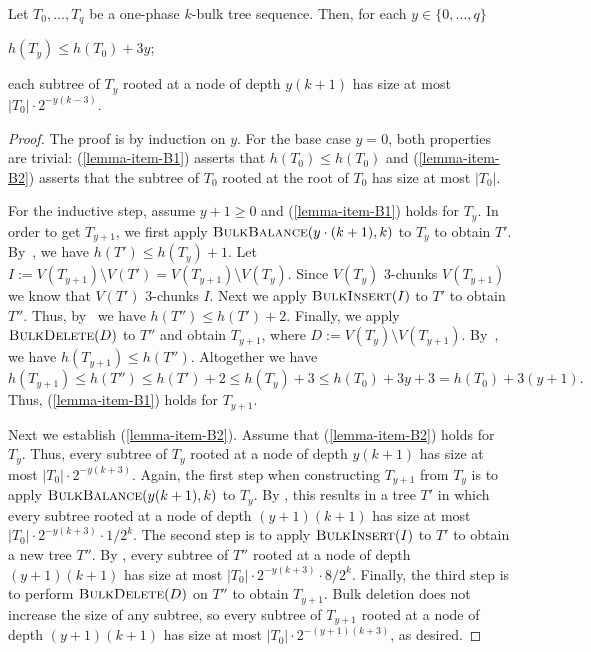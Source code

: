 \documentclass[kpfonts]{patmorin}
\let\le\leqslant
\let\ge\geqslant
\newcommand{\itemref}[1]{(\ref{#1})}
\begin{document}
\begin{lem}
Let $T_0,\ldots,T_{q}$ be a one-phase $k$-bulk tree sequence.
Then, for each $y\in\{0,\ldots,q\}$
\begin{compactenum}[(i)]
\item $h(T_y)\le h(T_0) + 3y$;\label{lemma-item-B1}
\item each subtree of $T_y$ rooted at a node of depth $y(k+1)$ has size at most
$|T_0|\cdot2^{-y(k-3)}$.\label{lemma-item-B2}
\end{compactenum}
\end{lem}
\begin{proof}
The proof is by induction on $y$.  For the base case $y=0$, both properties are trivial: \itemref{lemma-item-B1} asserts that $h(T_0)\le h(T_0)$ and \itemref{lemma-item-B2} asserts that the subtree of $T_0$ rooted at the root of $T_0$ has size at most $|T_0|$.

  For the inductive step, assume $y+1\ge 0$ and \itemref{lemma-item-B1} holds for $T_{y}$.
  In order to get $T_{y+1}$, we first apply $\textsc{BulkBalance}(y\cdot (k+1),k)$ to $T_y$ to obtain $T'$.
  By~, we have $h(T') \le h(T_y)+1$.
  Let $I:=V(T_{y+1})\setminus V(T') = V(T_{y+1})\setminus V(T_y)$.
  Since $V(T_y)$ $3$-chunks $V(T_{y+1})$ we know that $V(T')$ $3$-chunks $I$.
  Next we apply $\textsc{BulkInsert}(I)$ to $T'$ to obtain $T''$.
  Thus, by~ we have $h(T'') \le h(T')+2$.
  Finally, we apply $\textsc{BulkDelete}(D)$ to $T''$ and obtain $T_{y+1}$, where $D:=V(T_{y})\setminus V(T_{y+1})$.
  By~, we have $h(T_{y+1}) \le h(T'')$.
  Altogether we have
  \[
  h(T_{y+1}) \le h(T'') \le h(T') +2 \le h(T_y) +3 \le h(T_0) + 3y +3 = h(T_0) + 3(y+1).
  \]
  Thus, \itemref{lemma-item-B1} holds for $T_{y+1}$.

    Next we establish \itemref{lemma-item-B2}.
    Assume that \itemref{lemma-item-B2} holds for $T_{y}$.
    Thus, every subtree of $T_{y}$ rooted at a node of depth $y(k+1)$ has size at most $|T_{0}|\cdot2^{-y(k+3)}$.
    Again, the first step when constructing $T_{y+1}$ from $T_{y}$ is to apply $\textsc{BulkBalance}(y(k+1),k)$ to $T_{y}$.  By , this results in a tree $T'$ in which every subtree rooted at a node of depth $(y+1)(k+1)$ has size at most $|T_{0}|\cdot 2^{-y(k+3)}\cdot 1/2^k$.  The second step is to apply $\textsc{BulkInsert}(I)$ to $T'$ to obtain a new tree $T''$.
    By , every subtree of $T''$ rooted at a node of depth $(y+1)(k+1)$ has size at most $|T_{0}|\cdot 2^{-y(k+3)}\cdot 8/2^k$.  Finally, the third step is to perform $\textsc{BulkDelete}(D)$ on $T''$ to obtain $T_{y+1}$.  Bulk deletion does not increase the size of any subtree, so every subtree of $T_{y+1}$ rooted at a node of depth $(y+1)(k+1)$ has size at most $|T_{0}|\cdot 2^{-(y+1)(k+3)}$, as desired.
\end{proof}
\end{document}
